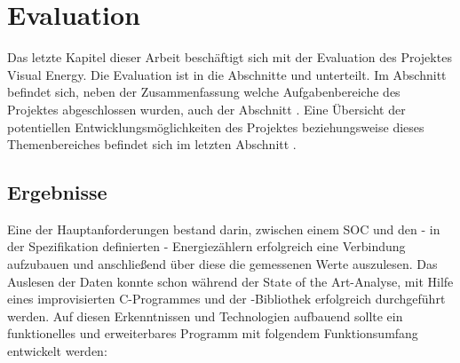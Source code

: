 \documentclass[Bachelorarbeit.tex]{subfiles}
\begin{document}
\chapter{Evaluation}
Das letzte Kapitel dieser Arbeit beschäftigt sich mit der Evaluation des Projektes Visual Energy. Die Evaluation ist in die Abschnitte \textbf{} und \textbf{} unterteilt. 
Im Abschnitt \textbf{} befindet sich, neben der Zusammenfassung welche Aufgabenbereiche des Projektes abgeschlossen wurden, auch der Abschnitt \textbf{}.
Eine Übersicht der potentiellen Entwicklungsmöglichkeiten des Projektes beziehungsweise dieses Themenbereiches befindet sich im letzten Abschnitt \textbf{}.

\section{Ergebnisse}
\label{sec:ergebnisse}

Eine der Hauptanforderungen bestand darin, zwischen einem \ac{SOC} und den - in der Spezifikation definierten - Energiezählern erfolgreich eine Verbindung aufzubauen und anschließend über diese die gemessenen Werte auszulesen. 
Das Auslesen der Daten konnte schon während der State of the Art-Analyse, mit Hilfe eines improvisierten C-Programmes und der -Bibliothek erfolgreich durchgeführt werden. 
Auf diesen Erkenntnissen und Technologien aufbauend sollte ein funktionelles und erweiterbares Programm mit folgendem Funktionsumfang entwickelt werden:
\end{document}
